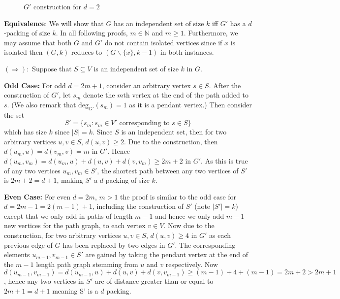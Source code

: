 \documentclass[10pt, a4paper]{article}
\theoremstyle{definition}
\newcommand{\N}{\mathbb{N}}
\newcommand{\bs}{\backslash}
\begin{document}
\begin{figure}[ht]
\begin{minipage}{.5\textwidth}
	\caption{$G'$ construction for $d = 2$}
\end{minipage}
\end{figure}

\clearpage

\textbf{Equivalence}: We will show that $G$ has an independent set of size $k$ iff $G'$ has a $d$-packing of size $k$.  In all following proofs, $m \in \N$ and $m \geq 1$. Furthermore, we may assume that both $G$ and $G'$ do not contain isolated vertices since if $x$ is isolated then $(G,k)$ reduces to $(G\bs\{x\},k-1)$ in both instances. 

$(\Rightarrow):$ Suppose that $S \subseteq V$ is an independent set of size $k$ in $G$.

\textbf{Odd Case:} For odd $d = 2m+1$, consider an arbitrary vertex $s \in S$. After the construction of $G'$, let $s_m$ denote the $m$th vertex at the end of the path added to $s$. (We also remark that $\mathrm{deg}_{G'}(s_m) = 1$ as it is a pendant vertex.) Then consider the set
\[ S' = \{ s_m : s_m \in V' \text{ corresponding to } s \in S \}\]
which has size $k$ since $|S| = k$.
Since $S$ is an independent set, then for two arbitrary vertices $u,v \in S$, $d(u,v) \geq 2$. Due to the construction, then $d(u_m,u) = d(v_m,v) = m$ in $G'$. Hence $d(u_m,v_m) = d(u_m,u) + d(u,v) + d(v,v_m) \geq 2m + 2$ in $G'$. As this is true of any two vertices $u_m, v_m \in S'$, the shortest path between any two vertices of $S'$ is $2m+2 = d+ 1$, making $S'$ a $d$-packing of size $k$.

\textbf{Even Case:} For even $d = 2m$, $m > 1$ the proof is similar to the odd case for $d = 2m - 1 = 2(m-1) + 1$, including the construction of $S'$ (note $|S'| = k$) except that we only add in paths of length $m-1$ and hence we only add $m-1$ new vertices for the path graph, to each vertex $v \in V$. Now due to the construction, for two arbitrary vertices $u,v \in S$, $d(u,v) \geq 4$ in $G'$ as each previous edge of $G$ has been replaced by two edges in $G'$. The corresponding elements $u_{m-1}, v_{m-1} \in S'$ are gained by taking the pendant vertex at the end of the $m-1$ length path graph stemming from $u$ and $v$ respectively. Now $d(u_{m-1},v_{m-1}) = d(u_{m-1},u) + d(u,v) + d(v,v_{m-1}) \geq (m - 1) + 4 + (m-1) = 2m + 2 > 2m + 1$, hence any two vertices in $S'$ are of distance greater than or equal to $2m + 1 = d+1$ meaning S' is a $d$ packing.
\end{document}
